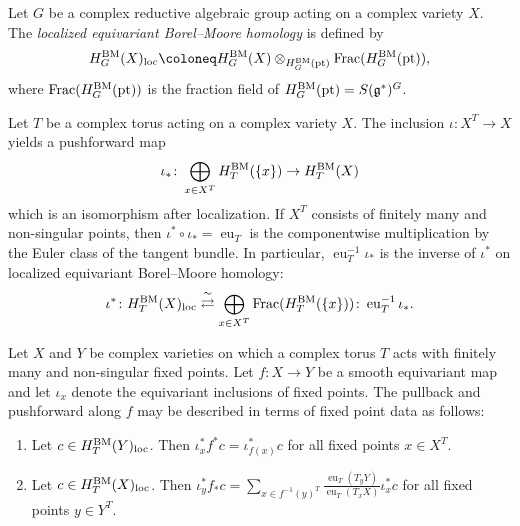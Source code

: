 \begin{definition}
	Let $G$ be a complex reductive algebraic group acting on a complex variety $X$. The \emph{localized equivariant Borel--Moore homology} is defined by
	\begin{equation}
		H_G^\textup{BM}(X)_\textup{loc} \coloneq H_G^\textup{BM}(X) \otimes_{H_G^\textup{BM}(\textup{pt})} \operatorname{Frac}(H_G^\textup{BM}(\textup{pt})),
	\end{equation}
	where $\operatorname{Frac}(H_G^\textup{BM}(\textup{pt}))$ is the fraction field of $H_G^\textup{BM}(\textup{pt}) = S(\mathfrak{g}^*)^G$.
\end{definition}

\begin{theorem}
	Let $T$ be a complex torus acting on a complex variety $X$. The inclusion $\iota \colon X^T \to X$ yields a pushforward map
	\begin{equation}
		\iota_* \colon \bigoplus_{x \in X^T} H_T^\textup{BM}(\{ x \}) \to H_T^\textup{BM}(X)
	\end{equation}
	which is an isomorphism after localization. If $X^T$ consists of finitely many and non-singular points, then $\iota^* \circ \iota_* = \operatorname{eu}_T$ is the componentwise multiplication by the Euler class of the tangent bundle. In particular, $\operatorname{eu}_T^{-1} \iota_*$ is the inverse of $\iota^*$ on localized equivariant Borel--Moore homology:
	\begin{equation}
		\iota^* \colon H_T^\textup{BM}(X)_\textup{loc} \overset \sim \rightleftarrows \bigoplus_{x \in X^T} \operatorname{Frac}(H_T^\textup{BM}(\{ x \})) \colon \operatorname{eu}_T^{-1} \iota_*.
	\end{equation}
\end{theorem}

\begin{corollary}
	Let $X$ and $Y$ be complex varieties on which a complex torus $T$ acts with finitely many and non-singular fixed points. Let $f\colon X \to Y$ be a smooth equivariant map and let $\iota_x$ denote the equivariant inclusions of fixed points. The pullback and pushforward along $f$ may be described in terms of fixed point data as follows:
	\begin{enumerate}[label=(\roman*)]
		\item Let $c \in H_T^\textup{BM}(Y)_\textup{loc}$. Then $\iota_x^* f^* c = \iota_{f(x)}^* c$ for all fixed points $x \in X^T$.
		\item Let $c \in H_T^\textup{BM}(X)_\textup{loc}$. Then $\iota_y^* f_* c = \sum_{x \in f^{-1}(y)^T} \frac{\operatorname{eu}_T(T_y Y)}{\operatorname{eu}_T(T_x X)} \iota_x^* c$ for all fixed points $y \in Y^T$.
	\end{enumerate}
\end{corollary}

